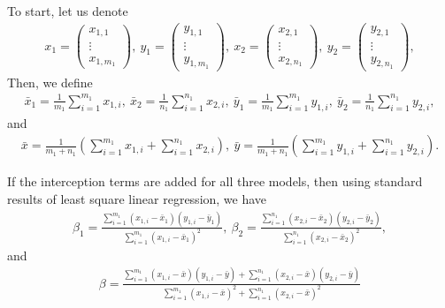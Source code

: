 \documentclass[12pt]{article}
\newcommand{\n}{n}
\newcommand{\nln}[1]{\n_{1}}
\newcommand{\m}{m}
\newcommand{\mln}[1]{\m_{1}}
\newcommand{\x}{x}
\newcommand{\y}{y}
\newcommand{\yln}[1]{y_{#1}}
\newcommand{\xln}[1]{x_{#1}}
\newcommand{\bet}{\beta}
\newcommand{\betln}[1]{\bet_{#1}}
\newcommand{\mean}[1]{ \bar{#1} }
\begin{document}
To start, let us denote 
\begin{align*}
    \xln{1} = \left( \begin{array}{cc}  \xln{1,1} \\
    	\vdots\\
    	\xln{1, \mln{1} } \end{array} \right),~\yln{1} = \left( \begin{array}{cc}  \yln{1,1} \\
    	\vdots\\
    	\yln{1, \mln{1} } \end{array} \right),~\xln{2} = \left( \begin{array}{cc}  \xln{2,1} \\
    	\vdots\\
    	\xln{2, \nln{1} } \end{array} \right),~\yln{2} = \left( \begin{array}{cc}  \yln{2,1} \\
    	\vdots\\
    	\yln{2, \nln{1} } \end{array} \right),
\end{align*}
Then, we define 
\begin{align*}
	\mean{\x}_1 = \frac{1}{\mln{1}} \sum_{i = 1}^{\mln{1}} \xln{1,i},~ 
	\mean{\x}_2 = \frac{1}{\nln{1}} \sum_{i = 1}^{\nln{1}} \xln{2,i},~	
	\mean{\y}_1 = \frac{1}{\mln{1}} \sum_{i = 1}^{\mln{1}} \yln{1,i},~ 
	\mean{\y}_2 = \frac{1}{\nln{1}} \sum_{i = 1}^{\nln{1}} \yln{2,i},
\end{align*}
and
\begin{align*}
	\mean{\x} = \frac{1}{\mln{1} + \nln{1}} \left( \sum_{i = 1}^{\mln{1}} \xln{1,i}  + \sum_{i = 1}^{\nln{1}} \xln{2,i}  \right),~\mean{\y} = \frac{1}{\mln{1} + \nln{1}} \left( \sum_{i = 1}^{\mln{1}} \yln{1,i}  + \sum_{i = 1}^{\nln{1}} \yln{2,i}  \right).
\end{align*}

If the interception terms are added for all three models, 
then using standard results of least square linear
regression, we have
\begin{align*}
	\betln{1}= \frac{\sum_{i= 1}^{\mln{1}} ( \xln{1,i}  -  \mean{\x}_1 )(\yln{1,i}  - \mean{\y}_1)}{\sum_{i=1}^{\mln{1}} (\xln{1,i} - \mean{\x}_1)^2},
	~\betln{2} = \frac{\sum_{i= 1}^{\nln{1}} ( \xln{2,i}  -  \mean{\x}_2)(\yln{2,i}  - \mean{\y}_2)}{\sum_{i=1}^{\nln{1}} (\xln{2,i} - \mean{\x}_2)^2},
\end{align*}
and
\begin{align*}
	\bet = \frac{\sum_{i= 1}^{\mln{1}} ( \xln{1,i}  -  \mean{\x})(\yln{1,i}  - \mean{\y}) + \sum_{i= 1}^{\nln{1}} ( \xln{2,i}  -  \mean{\x})(\yln{2,i}  - \mean{\y}) }{\sum_{i=1}^{\mln{1}} (\xln{1,i} - \mean{\x})^2 + \sum_{i=1}^{\nln{1}} (\xln{2,i} - \mean{\x})^2}
\end{align*}
\end{document}
